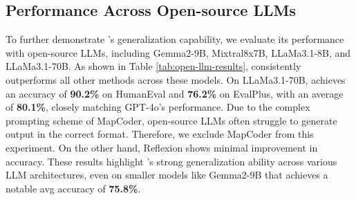 


\subsection{Performance Across Open-source LLMs}
\label{sec:exp:open-source}

To further demonstrate \toolnospace’s generalization capability, we evaluate its performance with open-source LLMs, including Gemma2-9B, Mixtral8x7B, LLaMa3.1-8B, and LLaMa3.1-70B. As shown in Table \ref{tab:open-llm-results}, \tool consistently outperforms all other methods across these models. On LLaMa3.1-70B, \tool achieves an accuracy of {\bf 90.2\%} on HumanEval and {\bf 76.2\%} on EvalPlus, with an average of {\bf 80.1\%}, closely matching GPT-4o's performance. Due to the complex prompting scheme of MapCoder, open-source LLMs often struggle to generate output in the correct format. Therefore, we exclude MapCoder from this experiment. On the other hand, Reflexion shows minimal improvement in accuracy. These results highlight \toolnospace's strong generalization ability across various LLM architectures, even on smaller models like Gemma2-9B that achieves a notable avg accuracy of {\bf 75.8\%}.



